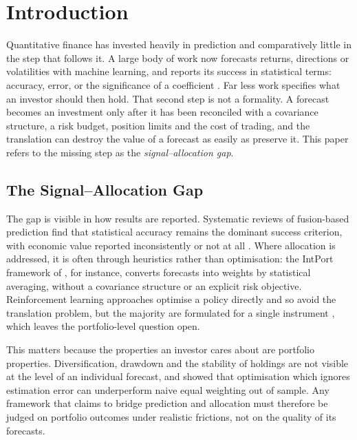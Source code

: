 \documentclass{singlecol-new}
\theoremstyle{TH}{
\newtheorem{lemma}{Lemma}
\newtheorem{theorem}[lemma]{Theorem}
\newtheorem{corrolary}[lemma]{Corrolary}
\newtheorem{conjecture}[lemma]{Conjecture}
\newtheorem{proposition}[lemma]{Proposition}
\newtheorem{claim}[lemma]{Claim}
\newtheorem{stheorem}[lemma]{Wrong Theorem}
\newtheorem{algorithm}{Algorithm}
}
\theoremstyle{THrm}{
\newtheorem{definition}{Definition}[section]
\newtheorem{question}{Question}[section]
\newtheorem{remark}{Remark}
\newtheorem{scheme}{Scheme}
}
\theoremstyle{THhit}{
\newtheorem{case}{Case}[section]
}
\begin{document}
\maketitle

\section{Introduction}
\label{sec:intro}

Quantitative finance has invested heavily in prediction and comparatively little in the
step that follows it. A large body of work now forecasts returns, directions or
volatilities with machine learning, and reports its success in statistical terms:
accuracy, error, or the significance of a coefficient \citep{gu20, zhang22}. Far less
work specifies what an investor should then hold. That second step is not a
formality. A forecast becomes an investment only after it has been reconciled with a
covariance structure, a risk budget, position limits and the cost of trading, and the
translation can destroy the value of a forecast as easily as preserve it. This paper
refers to the missing step as the \emph{signal--allocation gap}.

\subsection{The Signal--Allocation Gap}

The gap is visible in how results are reported. Systematic reviews of fusion-based
prediction find that statistical accuracy remains the dominant success criterion, with
economic value reported inconsistently or not at all \citep{zhang22}. Where allocation
is addressed, it is often through heuristics rather than optimisation: the IntPort
framework of \citet{sami25}, for instance, converts forecasts into weights by
statistical averaging, without a covariance structure or an explicit risk objective.
Reinforcement learning approaches optimise a policy directly and so avoid the
translation problem, but the majority are formulated for a single instrument
\citep{saijai26, jiang25}, which leaves the portfolio-level question open.

This matters because the properties an investor cares about are portfolio properties.
Diversification, drawdown and the stability of holdings are not visible at the level of
an individual forecast, and \citet{demiguel09} showed that optimisation which ignores
estimation error can underperform naive equal weighting out of sample. Any framework
that claims to bridge prediction and allocation must therefore be judged on portfolio
outcomes under realistic frictions, not on the quality of its forecasts.
\end{document}
